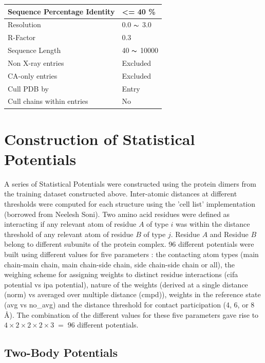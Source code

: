 \begin{center}
	\begin{tabular}{ | l | l | }
	\hline
	Sequence Percentage Identity & <= 40 \% \\ \hline
	Resolution & 0.0 $\thicksim$ 3.0 \\ \hline
	R-Factor & 0.3 \\ \hline
	Sequence Length & 40 $\thicksim$ 10000 \\ \hline
	Non X-ray entries & Excluded \\ \hline
	CA-only entries & Excluded \\ \hline
	Cull PDB by & Entry \\ \hline
	Cull chains within entries & No \\ \hline
	\end{tabular}
	\label{PISCES_table}
\end{center}

\section{Construction of Statistical Potentials}
A series of Statistical Potentials were constructed using the protein dimers from the training dataset constructed above. Inter-atomic distances at different thresholds were computed for each structure using the 'cell list' implementation (borrowed from Neelesh Soni). Two amino acid residues were defined as interacting if any relevant atom of residue $A$ of type $i$ was within the distance threshold of any relevant atom of residue $B$ of type $j$. Residue $A$ and Residue $B$ belong to different subunits of the protein complex. 96 different potentials were built using different values for five parameters : the contacting atom types (main chain-main chain, main chain-side chain, side chain-side chain or all), the weighing scheme for assigning weights to distinct residue interactions (cifa potential vs ipa potential),  nature of the weights (derived at a single distance (norm) vs averaged over multiple distance (cmpd)), weights in the reference state (avg vs no\_avg) and the distance threshold for contact participation (4, 6, or 8 {\AA}). The combination of the different values for these five parameters gave rise to $4 \times 2 \times 2 \times 2 \times 3 \;=\;96$ different potentials.

\subsection{Two-Body Potentials}


